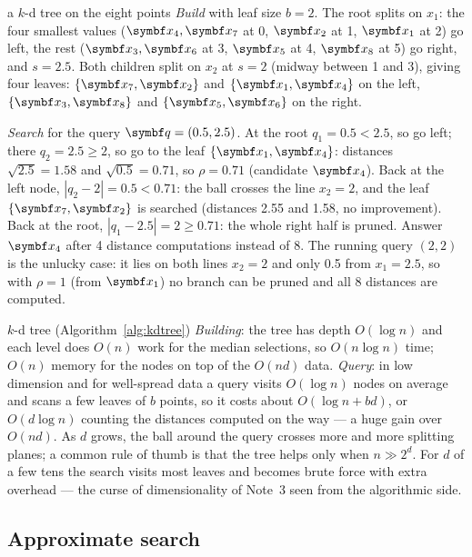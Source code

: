 \documentclass[11pt]{article}
\begin{document}
\begin{worked}{a $k$-d tree on the eight points}
\emph{Build} with leaf size $b = 2$. The root splits on $x_1$: the four smallest values ($\x_4, \x_7$ at 0, $\x_2$ at
1, $\x_1$ at 2) go left, the rest ($\x_3, \x_6$ at 3, $\x_5$ at 4, $\x_8$ at 5) go right, and $s = 2.5$. Both
children split on $x_2$ at $s = 2$ (midway between 1 and 3), giving four leaves:
$\{\x_7, \x_2\}$ and $\{\x_1, \x_4\}$ on the left, $\{\x_3, \x_8\}$ and $\{\x_5, \x_6\}$ on the right.

\emph{Search} for the query $\vect{q} = (0.5, 2.5)$. At the root $q_1 = 0.5 < 2.5$, so go left; there $q_2 = 2.5 \ge 2$,
so go to the leaf $\{\x_1, \x_4\}$: distances $\sqrt{2.5} = 1.58$ and $\sqrt{0.5} = 0.71$, so $\rho = 0.71$
(candidate $\x_4$). Back at the left node, $|q_2 - 2| = 0.5 < 0.71$: the ball crosses the line $x_2 = 2$, and the
leaf $\{\x_7, \x_2\}$ is searched (distances 2.55 and 1.58, no improvement). Back at the root, $|q_1 - 2.5| = 2 \ge
0.71$: the whole right half is pruned. Answer $\x_4$ after 4 distance computations instead of 8. The running query
$(2, 2)$ is the unlucky case: it lies on both lines $x_2 = 2$ and only 0.5 from $x_1 = 2.5$, so with $\rho = 1$ (from
$\x_1$) no branch can be pruned and all 8 distances are computed.
\end{worked}

\begin{runtime}{$k$-d tree (Algorithm~\ref{alg:kdtree})}
\emph{Building}: the tree has depth $O(\log n)$ and each level does $O(n)$ work for the median selections, so
$O(n \log n)$ time; $O(n)$ memory for the nodes on top of the $O(nd)$ data. \emph{Query}: in low dimension and for
well-spread data a query visits $O(\log n)$ nodes on average and scans a few leaves of $b$ points, so it costs about
$O(\log n + bd)$, or $O(d \log n)$ counting the distances computed on the way --- a huge gain over $O(nd)$. As $d$ grows, the ball around
the query crosses more and more splitting planes; a common rule of thumb is that the tree helps only when
$n \gg 2^d$. For $d$ of a few tens the search visits most leaves and becomes brute force with extra overhead --- the
curse of dimensionality of Note~3 seen from the algorithmic side.
\end{runtime}

\subsection{Approximate search}
\end{document}
